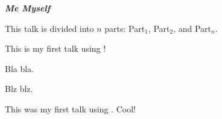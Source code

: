 \documentclass[landscape]{slides}
\begin{document}
 \vspace*{5cm}\centerline{{\large \bf \em Me Myself}}

	This talk is divided into $n$ parts: Part$_1$, Part$_2$,
        and Part$_n$.

	This is my first talk using {\ActiveDVI}!

	Bla bla.

	Blz blz.

	This was my first talk using {\ActiveDVI}. Cool!
\end{document}
